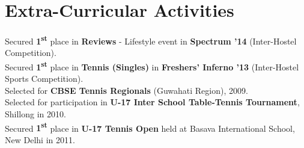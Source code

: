 \documentclass[a4paper]{norm-resume}
\begin{document}
\vspace{2mm}	%


\section{Extra-Curricular Activities}

\vspace{2mm} %
	
	Secured \textbf{1\textsuperscript{st}} place in \textbf{Reviews} - Lifestyle event in \textbf{Spectrum '14} (Inter-Hostel Competition).\\
	Secured \textbf{1\textsuperscript{st}} place in \textbf{Tennis (Singles)} in \textbf{Freshers' Inferno '13} (Inter-Hostel Sports Competition).\\	
	Selected for \textbf{CBSE Tennis Regionals} (Guwahati Region), 2009.\\
	Selected for participation in \textbf{U-17 Inter School Table-Tennis Tournament}, Shillong in 2010.\\
	Secured \textbf{1\textsuperscript{st}} place in \textbf{U-17 Tennis Open} held at Basava International School, New Delhi in 2011.\\
\end{document}
